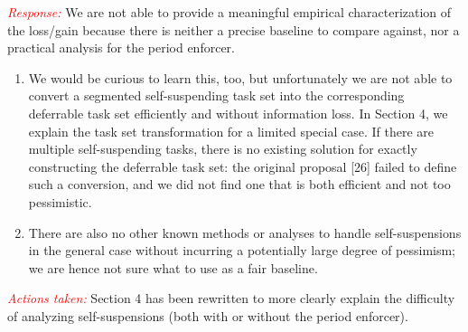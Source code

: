 \documentclass[12pt]{article}
\newenvironment{response}[0]{\textcolor{red}{\emph{Response: }}\color{blue}}{\medskip}
\newcommand{\action}[1]{\textcolor{red}{\emph{\it Actions taken: }}{\color{blue}#1}\medskip}
\begin{document}
\begin{itemize}
\begin{response}We are not able to provide a meaningful empirical characterization of the loss/gain because there is neither a precise baseline to compare against, nor a practical analysis for the period enforcer. 
\begin{enumerate}
	\item We would be curious to learn this, too, but unfortunately we are not able to convert a segmented self-suspending task set into the corresponding deferrable task set efficiently and without  information loss. In Section 4, we explain the task set transformation for a limited special case. If there are multiple self-suspending tasks, there is no existing solution for exactly constructing the deferrable task set: the original proposal [26] failed to define such a conversion, and we did not find one that is both efficient and not too pessimistic. 
	

\item There are also no other known methods or analyses to handle self-suspensions in the general case without incurring a potentially large degree of pessimism; we are hence not sure what to use as a fair baseline.
\end{enumerate}

	
\end{response}

\action{Section 4 has been rewritten to  more clearly explain the difficulty of analyzing self-suspensions (both with or without the period enforcer).}

\end{itemize}
\end{document}
